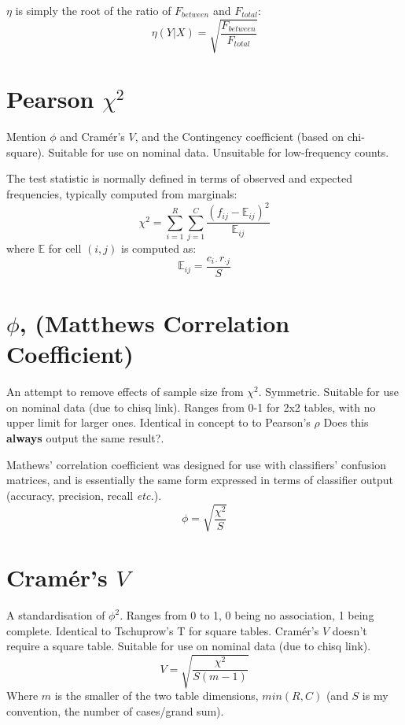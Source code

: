 \documentclass[11pt]{article}
\begin{document}
$\eta$ is simply the root of the ratio of $F_{between}$ and $F_{total}$:
$$
\eta(Y|X) = \sqrt{  \frac{ F_{between} }{ F_{total} }   }
$$


\section{Pearson $\chi^2$}
Mention $\phi$ and Cram\'er's $V$, and the Contingency coefficient (based on chi-square).  Suitable for use on nominal data.  Unsuitable for low-frequency counts.

The test statistic is normally defined in terms of observed and expected frequencies, typically computed from marginals:
$$
\chi^2 = \sum_{i=1}^R{  \sum_{j=1}^C{ \frac{ (f_{ij} - \mathbb{E}_{ij} )^2 }{ \mathbb{E}_{ij} } } }
$$
where $\mathbb{E}$ for cell $(i,j)$ is computed as:
$$
\mathbb{E}_{ij} = \frac{ c_{i \cdot} r_{\cdot j} }{ S }
$$


\section{$\phi$, (Matthews Correlation Coefficient)}
\label{section:phi}
An attempt to remove effects of sample size from $\chi^2$.  Symmetric. Suitable for use on nominal data (due to chisq link). %
Ranges from 0-1 for 2x2 tables, with no upper limit for larger ones.  Identical in concept to to Pearson's $\rho$ {\color{red} Does this \textbf{always} output the same result?}.

Mathews' correlation coefficient was designed for use with classifiers' confusion matrices, and is essentially the same form expressed in terms of classifier output (accuracy, precision, recall \textsl{etc.}). 
$$
\phi = \sqrt{ \frac{\chi^2}{S} }
$$




\section{Cram\'er's $V$}
A standardisation of $\phi^2$.  Ranges from 0 to 1, 0 being no association, 1 being complete.  Identical to Tschuprow's T for square tables.  Cram\'er's $V$ doesn't require a square table.  Suitable for use on nominal data (due to chisq link).
$$
V = \sqrt{ \frac{ \chi^2 }{ S( m - 1 )} }
$$
Where $m$ is the smaller of the two table dimensions, $min(R, C)$  (and $S$ is my convention, the number of cases/grand sum).
\end{document}
